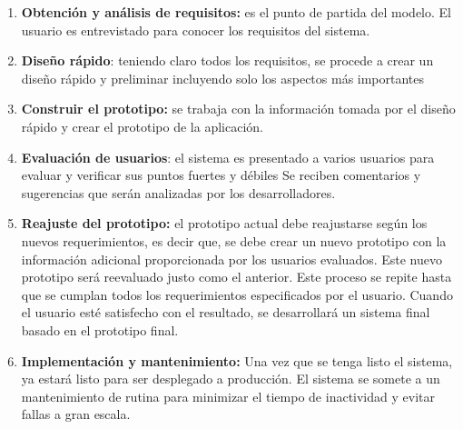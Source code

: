 \begin{enumerate}
	\item \textbf{Obtención y análisis de requisitos:} es el punto de partida del modelo. El usuario es entrevistado para conocer los requisitos del sistema.
	
	\item \textbf{Diseño rápido}: teniendo claro todos los requisitos, se procede a crear un diseño rápido y preliminar incluyendo solo los aspectos más importantes 
	
	\item\textbf{ Construir el prototipo:} se trabaja con la información tomada por el diseño rápido y crear el prototipo de la aplicación.
	
	\item \textbf{Evaluación de usuarios}: el sistema es presentado a varios usuarios para evaluar y verificar sus puntos fuertes y débiles Se reciben comentarios y sugerencias que serán analizadas por los desarrolladores.
	
	\item \textbf{Reajuste del prototipo:} el prototipo actual debe reajustarse según los nuevos requerimientos, es decir que, se debe crear un nuevo prototipo con la información adicional proporcionada por los usuarios evaluados. Este nuevo prototipo será reevaluado justo como el anterior. Este proceso se repite hasta que se cumplan todos los requerimientos especificados por el usuario. Cuando el usuario esté satisfecho con el resultado, se desarrollará un sistema final basado en el prototipo final. 
	
	\item \textbf{Implementación y mantenimiento:} Una vez que se tenga listo el sistema, ya estará listo para ser desplegado a producción. El sistema se somete a un mantenimiento de rutina para minimizar el tiempo de inactividad y evitar fallas a gran escala.
	
\end{enumerate}